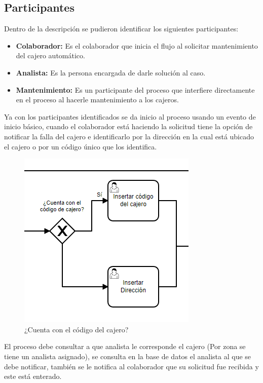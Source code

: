 \subsection{Participantes}
Dentro de la descripción se pudieron identificar los siguientes participantes: 
\begin{itemize}
	\item \textbf{Colaborador: }Es el colaborador que inicia el flujo al  solicitar mantenimiento del cajero automático.
	\item \textbf{Analista: } Es la persona encargada de darle solución al caso.
	\item \textbf{Mantenimiento: } Es un participante del proceso que interfiere directamente en el proceso al hacerle mantenimiento a los cajeros.
\end{itemize}

Ya con los participantes identificados se da inicio al proceso usando un evento de inicio básico, cuando el colaborador está haciendo la solicitud tiene la opción de notificar la falla del cajero e identificarlo por la dirección en la cual está ubicado el cajero o por un código único que los identifica.

\begin{figure}[H]
	\centering
	\includegraphics[scale=0.5]{Capitulo3/imagenes/1.png}
	\caption{¿Cuenta con el código del cajero?}
	\label{CodCaj}
\end{figure}

El proceso debe consultar a que analista le corresponde el cajero (Por zona se tiene un analista asignado), se consulta en la base de datos el analista al que se debe notificar, también se le notifica al colaborador que su solicitud fue recibida y este está enterado.

